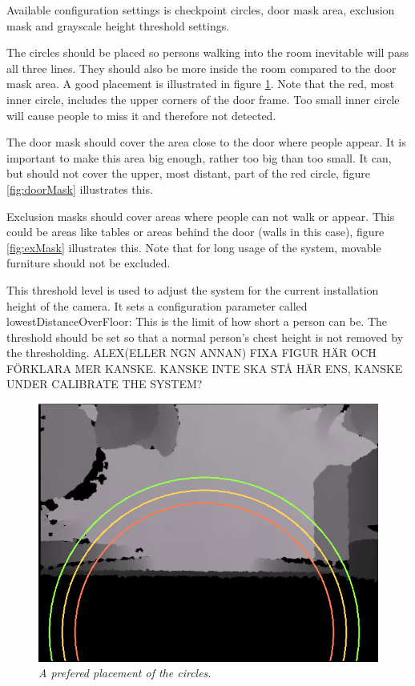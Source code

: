 Available configuration settings is checkpoint circles, door mask area, exclusion mask and grayscale height threshold settings. 

The circles should be placed so persons walking into the room inevitable will pass all three lines. They should also be more inside the room compared to the door mask area. A good placement is illustrated in figure \ref{fig:circlePlacement}. Note that the red, most inner circle, includes the upper corners of the door frame. Too small inner circle will cause people to miss it and therefore not detected. 

The door mask should cover the area close to the door where people appear. It is important to make this area big enough, rather too big than too small. It can, but should not cover the upper, most distant, part of the red circle, figure \ref{fig:doorMask} illustrates this.

Exclusion masks should cover areas where people can not walk or appear. This could be areas like tables or areas behind the door (walls in this case), figure \ref{fig:exMask} illustrates this. Note that for long usage of the system, movable furniture should not be excluded. 

This threshold level is used to adjust the system for the current installation height of the camera. It sets a configuration parameter called lowestDistanceOverFloor: This is the limit of how short a person can be. The threshold should be set so that a normal person’s chest height is not removed by the thresholding. ALEX(ELLER NGN ANNAN) FIXA FIGUR HÄR OCH FÖRKLARA MER KANSKE. KANSKE  INTE SKA STÅ HÄR ENS, KANSKE UNDER CALIBRATE THE SYSTEM?


\begin{figure}[H]
	\centering
	\includegraphics[width=\linewidth]{images/Manual2.png}
	\caption[Circle placment]{\textit{A prefered placement of the circles. }}
	\label{fig:circlePlacement}  %
\end{figure}



